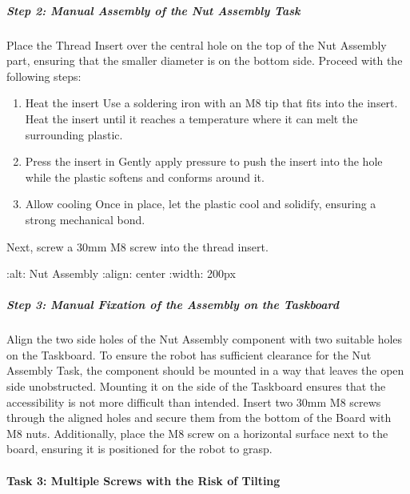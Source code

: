 \documentclass[letterpaper,10pt,english]{sphinxmanual}
\begin{document}
\subparagraph{Step 2: Manual Assembly of the Nut Assembly Task}
\label{\detokenize{4-Assembly-Instructions-Screws-and-Nuts:step-2-manual-assembly-of-the-nut-assembly-task}}
\sphinxAtStartPar
Place the Thread Insert over the central hole on the top of the Nut Assembly part, ensuring that the smaller diameter is on the bottom side.
Proceed with the following steps:
\begin{enumerate}
%
\item {} 
\sphinxAtStartPar
Heat the insert \textendash{} Use a soldering iron with an M8 tip that fits into the insert. Heat the insert until it reaches a temperature where it can melt the surrounding plastic.

\item {} 
\sphinxAtStartPar
Press the insert in \textendash{} Gently apply pressure to push the insert into the hole while the plastic softens and conforms around it.

\item {} 
\sphinxAtStartPar
Allow cooling \textendash{} Once in place, let the plastic cool and solidify, ensuring a strong mechanical bond.

\end{enumerate}

\sphinxAtStartPar
Next, screw a 30mm M8 screw into the thread insert.

\noindent{}

\sphinxAtStartPar
    :alt: Nut Assembly
    :align: center
    :width: 200px


\subparagraph{Step 3: Manual Fixation of the Assembly on the Taskboard}
\label{\detokenize{4-Assembly-Instructions-Screws-and-Nuts:id2}}
\sphinxAtStartPar
Align the two side holes of the Nut Assembly component with two suitable holes on the Taskboard. To ensure the robot has sufficient clearance for the Nut Assembly Task, the component should be mounted in a way that leaves the open side unobstructed. Mounting it on the side of the Taskboard ensures that the accessibility is not more difficult than intended.
Insert two 30mm M8 screws through the aligned holes and secure them from the bottom of the Board with M8 nuts.
Additionally, place the M8 screw on a horizontal surface next to the board, ensuring it is positioned for the robot to grasp.


\paragraph{Task 3: Multiple Screws with the Risk of Tilting}
\label{\detokenize{4-Assembly-Instructions-Screws-and-Nuts:task-3-multiple-screws-with-the-risk-of-tilting}}
\end{document}
